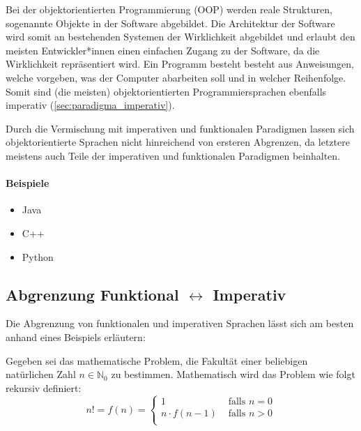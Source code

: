     Bei der objektorientierten Programmierung (OOP) werden reale Strukturen, sogenannte Objekte in der Software abgebildet. Die Architektur der Software wird somit an bestehenden Systemen der Wirklichkeit abgebildet und erlaubt den meisten Entwickler*innen einen einfachen Zugang zu der Software, da die Wirklichkeit repräsentiert wird. Ein Programm besteht besteht aus Anweisungen, welche vorgeben, was der Computer abarbeiten soll und in welcher Reihenfolge. Somit sind (die meisten) objektorientierten Programmiersprachen ebenfalls imperativ (\ref{sec:paradigma_imperativ}).
    
    Durch die Vermischung mit imperativen und funktionalen Paradigmen lassen sich objektorientierte Sprachen nicht hinreichend von ersteren Abgrenzen, da letztere meistens auch Teile der imperativen und funktionalen Paradigmen beinhalten.
    
    \paragraph{Beispiele}
        \begin{itemize}
            \item Java
            \item C++
            \item Python
        \end{itemize}

\subsection{Abgrenzung Funktional $ \leftrightarrow $ Imperativ}
	\label{sec:paradigma_abgrenzung_funktional_imperativ}

    Die Abgrenzung von funktionalen und imperativen Sprachen lässt sich am besten anhand eines Beispiels erläutern:
    
    Gegeben sei das mathematische Problem, die Fakultät einer beliebigen natürlichen Zahl $ n \in \mathbb{N} _ 0 $ zu bestimmen. Mathematisch wird das Problem wie folgt rekursiv definiert:
    \begin{equation*}
        n! = f(n) = \begin{cases*}
            1 & \text{ falls } n = 0 \\
            n \cdot f(n - 1) & \text{ falls } n > 0 \\
        \end{cases*}
    \end{equation*}
    
